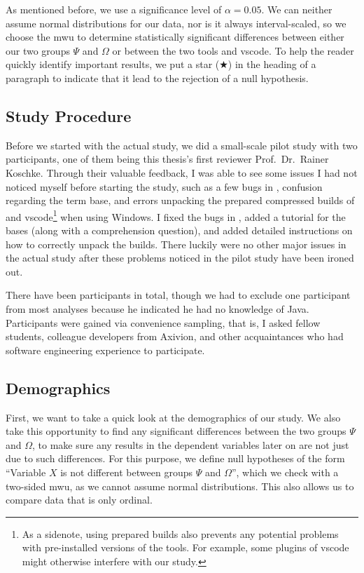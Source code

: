 \documentclass[../thesis]{subfiles}
\begin{document}
As mentioned before, we use a significance level of $\alpha = 0.05$.
We can neither assume normal distributions for our data, nor is it always interval-scaled, so we choose the \gls{mwu} to determine statistically significant differences between either our two groups $\Psi$ and $\Omega$ or between the two tools \SEE{} and \gls{vscode}.
To help the reader quickly identify important results, we put a star ($\bigstar$) in the heading of a paragraph to indicate that it lead to the rejection of a null hypothesis.

\subsection{Study Procedure}\label{subsec:procedure}
Before we started with the actual study, we did a small-scale pilot study with two participants, one of them being this thesis's first reviewer Prof.\ Dr.\ Rainer Koschke.
Through their valuable feedback, I was able to see some issues I had not noticed myself before starting the study, such as a few bugs in \SEE{}, confusion regarding the term \gls{base}, and errors unpacking the prepared compressed builds of \SEE{} and \gls{vscode}\footnote{
	As a sidenote, using prepared builds also prevents any potential problems with pre-installed versions of the tools.
	For example, some plugins of \gls{vscode} might otherwise interfere with our study.
} when using Windows.
I fixed the bugs in \SEE{}, added a tutorial for the \glspl{base} (along with a comprehension question), and added detailed instructions on how to correctly unpack the builds.
There luckily were no other major issues in the actual study after these problems noticed in the pilot study have been ironed out.

There have been \participants participants in total, though we had to exclude one participant from most analyses because he indicated he had no knowledge of Java.
Participants were gained via convenience sampling, that is, I asked fellow students, colleague developers from Axivion, and other acquaintances who had software engineering experience to participate.


\subsection{Demographics}\label{subsec:demographics}

First, we want to take a quick look at the demographics of our study.
We also take this opportunity to find any significant differences between the two groups $\Psi$ and $\Omega$, to make sure any results in the dependent variables later on are not just due to such differences.
For this purpose, we define null hypotheses of the form \enquote{Variable $X$ is not different between groups $\Psi$ and $\Omega$}, which we check with a two-sided \gls{mwu}, as we cannot assume normal distributions.
This also allows us to compare data that is only ordinal.
\end{document}
